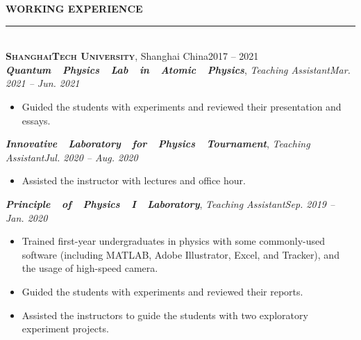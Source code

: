 \documentclass[letterpaper,11pt]{article}
\begin{document}
{\Large\bfseries{}WORKING EXPERIENCE}\\
\rule[1.5ex]{\columnwidth}{1pt}
\vspace{-4ex}\\
{\large\bfseries\scshape{}ShanghaiTech University}, Shanghai China\hfill{2017 -- 2021}\\
{\bfseries\itshape{}Quantum~~Physics~~Lab~~in~~Atomic~~Physics}, {\itshape{}Teaching Assistant}\hfill{\itshape{}Mar. 2021 -- Jun. 2021}\\
\vspace{-4ex}
\begin{itemize}
    \item Guided the students with experiments and reviewed their presentation and essays.
\end{itemize}
\vspace{-1ex}
{\bfseries\itshape{}Innovative~~Laboratory~~for~~Physics~~Tournament}, {\itshape{}Teaching Assistant}\hfill{\itshape{}Jul. 2020 -- Aug. 2020}\\
\vspace{-4ex}
\begin{itemize}
    \item Assisted the instructor with lectures and office hour.
\end{itemize}
\vspace{-1ex}
{\bfseries\itshape{}Principle~~of~~Physics~~I~~Laboratory}, {\itshape{}Teaching Assistant}\hfill{\itshape{}Sep. 2019 -- Jan. 2020}\\
\vspace{-4ex}
\begin{itemize}
    \item Trained first-year undergraduates in physics with some commonly-used software (including MATLAB, Adobe Illustrator, Excel, and Tracker), and the usage of high-speed camera.
    \item Guided the students with experiments and reviewed their reports.
    \item Assisted the instructors to guide the students with two exploratory experiment projects.
\end{itemize}
\end{document}
